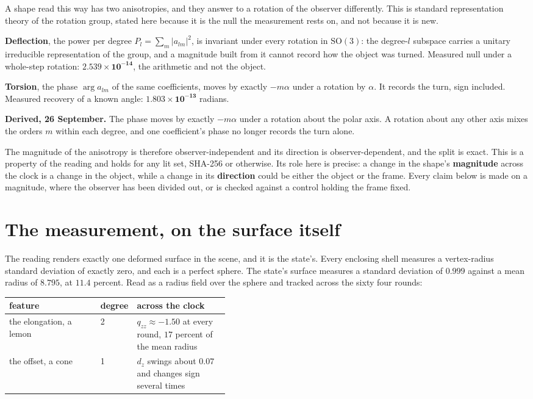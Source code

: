 A shape read this way has two anisotropies, and they answer to a rotation of the observer differently. This is standard representation theory of the rotation group, stated here because it is the null the measurement rests on, and not because it is new.

\textbf{Deflection}, the power per degree \(P_l = \sum_m |a_{lm}|^2\), is invariant under every rotation in \(\mathrm{SO}(3)\): the degree-\(l\) subspace carries a unitary irreducible representation of the group, and a magnitude built from it cannot record how the object was turned. Measured null under a whole-step rotation: \(\mathbf{2.539 \times 10^{-14}}\), the arithmetic and not the object.

\textbf{Torsion}, the phase \(\arg a_{lm}\) of the same coefficients, moves by exactly \(-m\alpha\) under a rotation by \(\alpha\). It records the turn, sign included. Measured recovery of a known angle: \(\mathbf{1.803 \times 10^{-13}}\) radians.

\textbf{Derived, 26 September.} The phase moves by exactly \(-m\alpha\) under a rotation about the polar axis. A rotation about any other axis mixes the orders \(m\) within each degree, and one coefficient's phase no longer records the turn alone.

The magnitude of the anisotropy is therefore observer-independent and its direction is observer-dependent, and the split is exact. This is a property of the reading and holds for any lit set, SHA-256 or otherwise. Its role here is precise: a change in the shape's \textbf{magnitude} across the clock is a change in the object, while a change in its \textbf{direction} could be either the object or the frame. Every claim below is made on a magnitude, where the observer has been divided out, or is checked against a control holding the frame fixed.

\section{The measurement, on the surface itself}

The reading renders exactly one deformed surface in the scene, and it is the state's. Every enclosing shell measures a vertex-radius standard deviation of exactly zero, and each is a perfect sphere. The state's surface measures a standard deviation of \(0.999\) against a mean radius of \(8.795\), at \(11.4\) percent. Read as a radius field over the sphere and tracked across the sixty four rounds:

\begin{center}
\begin{tabular}{@{}llp{0.42\linewidth}@{}}
\toprule
feature & degree & across the clock \\
\midrule
the elongation, a lemon & 2 & \(q_{zz} \approx -1.50\) at every round, \(17\) percent of the mean radius \\
the offset, a cone & 1 & \(d_z\) swings about \(0.07\) and changes sign several times \\
\bottomrule
\end{tabular}
\end{center}

